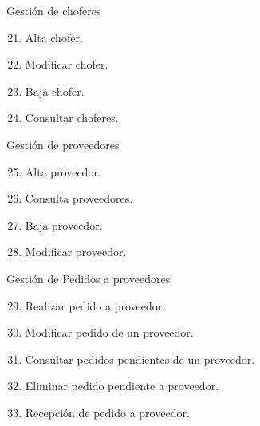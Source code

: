 \documentclass[letterpaper,10pt,english]{sphinxmanual}
\begin{document}
Gestión de choferes
\begin{enumerate}
\setcounter{enumi}{20}
\item {} 
Alta chofer.

\item {} 
Modificar chofer.

\item {} 
Baja chofer.

\item {} 
Consultar choferes.

\end{enumerate}

Gestión de proveedores
\begin{enumerate}
\setcounter{enumi}{24}
\item {} 
Alta proveedor.

\item {} 
Consulta proveedores.

\item {} 
Baja proveedor.

\item {} 
Modificar proveedor.

\end{enumerate}

Gestión de Pedidos a proveedores
\begin{enumerate}
\setcounter{enumi}{28}
\item {} 
Realizar pedido a proveedor.

\item {} 
Modificar pedido de un proveedor.

\item {} 
Consultar pedidos pendientes de un proveedor.

\item {} 
Eliminar pedido pendiente a proveedor.

\item {} 
Recepción de pedido a proveedor.

\end{enumerate}
\end{document}

